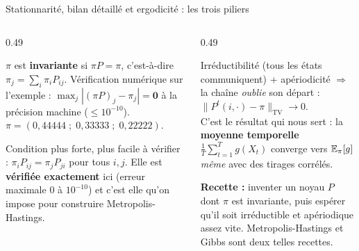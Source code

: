 \begin{frame}{Stationnarité, bilan détaillé et ergodicité : les trois piliers}
\begin{columns}[t]
\begin{column}{0.49\textwidth}
\begin{kbox}[1. Stationnarité]
$\pi$ est \textbf{invariante} si $\pi P = \pi$, c'est-à-dire
$\pi_j = \sum_i \pi_i P_{ij}$. Vérification numérique sur l'exemple :
$\max_j |(\pi P)_j - \pi_j| = \mathbf{0}$ à la précision machine ($\le 10^{-10}$).
\\[1mm]
$\pi = (0{,}44444\;;\;0{,}33333\;;\;0{,}22222)$.
\end{kbox}
\begin{kbox}
Condition plus forte, plus facile à vérifier :
$\pi_i P_{ij} = \pi_j P_{ji}$ pour tous $i, j$.
Elle est \textbf{vérifiée exactement} ici (erreur maximale $0$ à $10^{-10}$) et
c'est elle qu'on impose pour construire Metropolis-Hastings.
\end{kbox}
\end{column}
\begin{column}{0.49\textwidth}
\begin{kbox}[3. Ergodicité]
Irréductibilité (tous les états communiquent) + apériodicité $\Rightarrow$ la
chaîne \emph{oublie} son départ :
$\|P^t(i,\cdot) - \pi\|_{\text{TV}} \to 0$.
\\[1mm]
C'est le résultat qui nous sert : la \textbf{moyenne temporelle}
$\frac1T\sum_{t=1}^{T} g(X_t)$ converge vers $\mathbb{E}_\pi[g]$ \emph{m\^eme} avec des
tirages corrélés.
\end{kbox}
\begin{tcolorbox}[colback=byCyan!8,colframe=byCyan,arc=2mm]
\small\textbf{Recette :} inventer un noyau $P$ dont $\pi$ est invariante, puis
espérer qu'il soit irréductible et apériodique assez vite.
Metropolis-Hastings et Gibbs sont deux telles recettes.
\end{tcolorbox}
\end{column}
\end{columns}
\end{frame}

